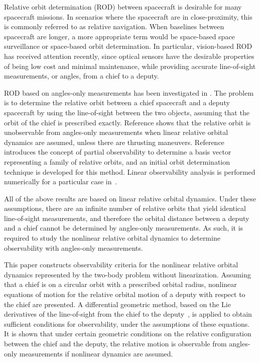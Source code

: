 Relative orbit determination (ROD) between spacecraft is desirable for many spacecraft missions. In scenarios where the spacecraft are in close-proximity, this is commonly referred to as relative navigation. When baselines between spacecraft are longer, a more appropriate term would be space-based space surveillance or space-based orbit determination. In particular, vision-based ROD has received attention recently, since optical sensors have the desirable properties of being low cost and minimal maintenance, while providing accurate line-of-sight measurements, or angles, from a chief to a deputy.

ROD based on angles-only measurements has been investigated in \cite{WofGelITAES09,PatLovPASFMM12}. The problem is to determine the relative orbit between a chief spacecraft and a deputy spacecraft by using the line-of-sight between the two objects, assuming that the orbit of the chief is prescribed exactly. Reference \cite{WofGelITAES09} shows that the relative orbit is unobservable from angles-only measurements when linear relative orbital dynamics are assumed, unless there are thrusting maneuvers. Reference~\cite{PatLovPASFMM12} introduces the concept of partial observability to determine a basis vector representing a family of relative orbits, and an initial orbit determination technique is developed for this method. Linear observability analysis is performed numerically for a particular case in~\cite{YimCraPASMM04}. 

All of the above results are based on linear relative orbital dynamics.
Under these assumptions, there are an infinite number of relative orbits that yield identical line-of-sight measurements, and therefore the orbital distance between a deputy and a chief cannot be determined by angles-only measurements. As such, it is required to study the nonlinear relative orbital dynamics to determine observability with angles-only measurements. 


This paper constructs observability criteria for the nonlinear relative orbital dynamics represented by the two-body problem without linearization. Assuming that a chief is on a circular orbit with a prescribed orbital radius, nonlinear equations of motion for the relative orbital motion of a deputy with respect to the chief are presented. A differential geometric method, based on the Lie derivatives of the line-of-sight from the chief to the deputy~\cite{HerKreITAC77}, is applied to obtain sufficient conditions for observability, under the assumptions of these equations. It is shown that under certain geometric conditions on the relative configuration between the chief and the deputy, the relative motion is observable from angles-only measurements if nonlinear dynamics are assumed.

